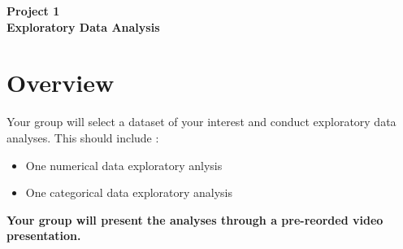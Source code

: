 \documentclass[12pt]{article}
\begin{document}
\begin{center}
\textbf{\Large Project 1 \\ Exploratory Data Analysis } 
\end{center}


\section*{Overview}
Your group will select a dataset of your interest and conduct exploratory data analyses.
This should include :
\begin{itemize}
    \item One numerical data exploratory anlysis
    \item One categorical data exploratory analysis 
\end{itemize} 
\textbf{Your group will present the analyses through a pre-reorded video presentation.}
\end{document}
